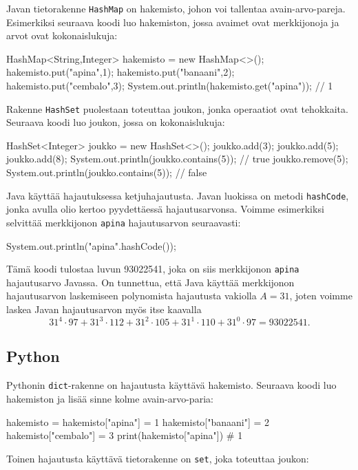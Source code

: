 Javan tietorakenne \texttt{HashMap} on hakemisto,
johon voi tallentaa avain-arvo-pareja.
Esimerkiksi seuraava koodi luo hakemiston,
jossa avaimet ovat merkkijonoja ja arvot ovat kokonaislukuja:

\begin{code}
HashMap<String,Integer> hakemisto = new HashMap<>();
hakemisto.put("apina",1);
hakemisto.put("banaani",2);
hakemisto.put("cembalo",3);
System.out.println(hakemisto.get("apina")); // 1
\end{code}

Rakenne \texttt{HashSet} puolestaan toteuttaa joukon,
jonka operaatiot ovat tehokkaita.
Seuraava koodi luo joukon, jossa on kokonaislukuja:

\begin{code}
HashSet<Integer> joukko = new HashSet<>();
joukko.add(3);
joukko.add(5);
joukko.add(8);
System.out.println(joukko.contains(5)); // true
joukko.remove(5);
System.out.println(joukko.contains(5)); // false
\end{code}

Java käyttää hajautuksessa ketjuhajautusta.
Javan luokissa on metodi \texttt{hashCode},
jonka avulla olio kertoo pyydettäessä hajautusarvonsa.
Voimme esimerkiksi selvittää merkkijonon \texttt{apina}
hajautusarvon seuraavasti:

\begin{code}
System.out.println("apina".hashCode());
\end{code}

Tämä koodi tulostaa luvun 93022541,
joka on siis merkkijonon \texttt{apina} hajautusarvo Javassa.
On tunnettua, että Java käyttää merkkijonon hajautusarvon laskemiseen
polynomista hajautusta vakiolla $A=31$,
joten voimme laskea Javan hajautusarvon myös itse kaavalla
\[31^4 \cdot 97+31^3 \cdot 112+31^2 \cdot 105+31^1 \cdot 110+31^0 \cdot 97=93022541.\]

\subsection{Python}

Pythonin \texttt{dict}-rakenne on hajautusta käyttävä hakemisto.
Seuraava koodi luo hakemiston ja lisää sinne kolme
avain-arvo-paria:

\begin{code}
hakemisto = {}
hakemisto["apina"] = 1
hakemisto["banaani"] = 2
hakemisto["cembalo"] = 3
print(hakemisto["apina"]) # 1
\end{code}

Toinen hajautusta käyttävä tietorakenne on \texttt{set},
joka toteuttaa joukon:

